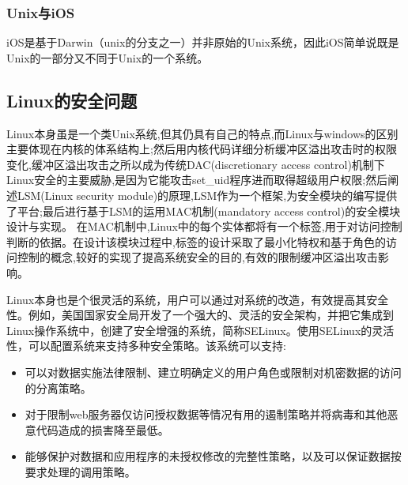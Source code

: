 \documentclass{article}
\begin{document}
\subsubsection{Unix与iOS}\par
iOS是基于Darwin（unix的分支之一）并非原始的Unix系统，因此iOS简单说既是Unix的一部分又不同于Unix的一个系统。
\par
\subsection{Linux的安全问题}
Linux本身虽是一个类Unix系统,但其仍具有自己的特点,而Linux与windows的区别主要体现在内核的体系结构上;然后用内核代码详细分析缓冲区溢出攻击时的权限变化,缓冲区溢出攻击之所以成为传统DAC(discretionary access control)机制下Linux安全的主要威胁,是因为它能攻击set\_uid程序进而取得超级用户权限;然后阐述LSM(Linux security module)的原理,LSM作为一个框架,为安全模块的编写提供了平台;最后进行基于LSM的运用MAC机制(mandatory access control)的安全模块设计与实现。 在MAC机制中,Linux中的每个实体都将有一个标签,用于对访问控制判断的依据。在设计该模块过程中,标签的设计采取了最小化特权和基于角色的访问控制的概念,较好的实现了提高系统安全的目的,有效的限制缓冲区溢出攻击影响。\citep{黄世杰2005linux}\par
Linux本身也是个很灵活的系统，用户可以通过对系统的改造，有效提高其安全性。例如，美国国家安全局开发了一个强大的、灵活的安全架构，并把它集成到Linux操作系统中，创建了安全增强的系统，简称SELinux\citep{loscocco2001integrating}。使用SELinux的灵活性，可以配置系统来支持多种安全策略。该系统可以支持:\par
\begin{itemize}
\item 可以对数据实施法律限制、建立明确定义的用户角色或限制对机密数据的访问的分离策略。
\item 对于限制web服务器仅访问授权数据等情况有用的遏制策略并将病毒和其他恶意代码造成的损害降至最低。
\item 能够保护对数据和应用程序的未授权修改的完整性策略，以及可以保证数据按要求处理的调用策略。
\end{itemize}
\end{document}
